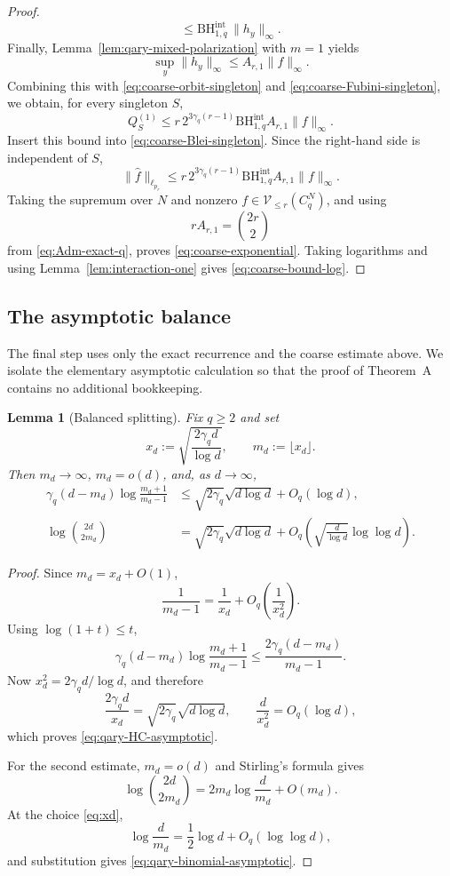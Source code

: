\documentclass[11pt,a4paper]{article}
\numberwithin{equation}{section}
\theoremstyle{cleanplain}
\newtheorem{lemma}[lemma]{Lemma}
\theoremstyle{cleandefinition}
\theoremstyle{cleanremark}
\newcommand{\BHint}[2]{\mathrm{BH}^{\mathrm{int}}_{#1,#2}}
\begin{document}
\begin{proof}
\[ \leq \BHint{1}{q}\,\|h_y\|_\infty.
\]
Finally, Lemma~\ref{lem:qary-mixed-polarization} with $m=1$ yields
\[
 \sup_y\|h_y\|_\infty\leq A_{r,1}\|f\|_\infty.
\]
Combining this with \eqref{eq:coarse-orbit-singleton} and
\eqref{eq:coarse-Fubini-singleton}, we obtain, for every singleton $S$,
\[
 Q_S^{(1)}
 \leq
 r\,2^{3\gamma_q(r-1)}\BHint{1}{q}A_{r,1}\|f\|_\infty.
\]
Insert this bound into \eqref{eq:coarse-Blei-singleton}.  Since the right-hand
side is independent of $S$,
\[
 \|\widehat f\|_{\ell_{p_r}}
 \leq
 r\,2^{3\gamma_q(r-1)}\BHint{1}{q}A_{r,1}\|f\|_\infty.
\]
Taking the supremum over $N$ and nonzero
$f\in\mathcal V_{\leq r}(C_q^N)$, and using
\[
 rA_{r,1}=\binom{2r}{2}
\]
from \eqref{eq:Adm-exact-q}, proves \eqref{eq:coarse-exponential}.  Taking
logarithms and using Lemma~\ref{lem:interaction-one} gives
\eqref{eq:coarse-bound-log}.
\end{proof}

\subsection{The asymptotic balance}\label{subsec:asymptotic-balance}

The final step uses only the exact recurrence and the coarse estimate above.
We isolate the elementary asymptotic calculation so that the proof of
Theorem~A contains no additional bookkeeping.

\begin{lemma}[Balanced splitting]\label{lem:balanced-splitting}
Fix $q\geq2$ and set
\begin{equation}\label{eq:xd}
 x_d:=\sqrt{\frac{2\gamma_qd}{\log d}},
 \qquad
 m_d:=\lfloor x_d\rfloor.
\end{equation}
Then $m_d\to\infty$, $m_d=o(d)$, and, as $d\to\infty$,
\begin{align}
 \gamma_q(d-m_d)\log\frac{m_d+1}{m_d-1}
 &\leq
 \sqrt{2\gamma_q}\sqrt{d\log d}+O_q(\log d),
 \label{eq:qary-HC-asymptotic}\\
 \log\binom{2d}{2m_d}
 &=
 \sqrt{2\gamma_q}\sqrt{d\log d}
 +O_q\!\left(\sqrt{\frac d{\log d}}\log\log d\right).
 \label{eq:qary-binomial-asymptotic}
\end{align}
\end{lemma}

\begin{proof}
Since $m_d=x_d+O(1)$,
\[
 \frac1{m_d-1}=\frac1{x_d}+O_q\!\left(\frac1{x_d^2}\right).
\]
Using $\log(1+t)\leq t$,
\[
 \gamma_q(d-m_d)\log\frac{m_d+1}{m_d-1}
 \leq\frac{2\gamma_q(d-m_d)}{m_d-1}.
\]
Now $x_d^2=2\gamma_qd/\log d$, and therefore
\[
 \frac{2\gamma_qd}{x_d}
 =\sqrt{2\gamma_q}\sqrt{d\log d},
 \qquad
 \frac d{x_d^2}=O_q(\log d),
\]
which proves \eqref{eq:qary-HC-asymptotic}.

For the second estimate, $m_d=o(d)$ and Stirling's formula gives
\[
 \log\binom{2d}{2m_d}
 =2m_d\log\frac d{m_d}+O(m_d).
\]
At the choice \eqref{eq:xd},
\[
 \log\frac d{m_d}
 =\frac12\log d+O_q(\log\log d),
\]
and substitution gives \eqref{eq:qary-binomial-asymptotic}.
\end{proof}
\end{document}
